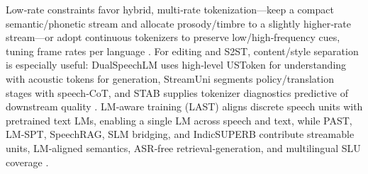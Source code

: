 \documentclass{article}
\begin{document}
Low‑rate constraints favor hybrid, multi‑rate tokenization—keep a compact semantic/phonetic stream and allocate prosody/timbre to a slightly higher‑rate stream—or adopt continuous tokenizers to preserve low/high‑frequency cues, tuning frame rates per language \cite{li2025continuousspeechtokenizertext,zhang2025impactframeratesspeechtokenizercasestudy,yang2025almtokenizerlowbitratesemanticrichaudioc,yang2025diffsoundstreamefficientspeechtokenizati}. For editing and S2ST, content/style separation is especially useful: DualSpeechLM uses high‑level USToken for understanding with acoustic tokens for generation, StreamUni segments policy/translation stages with speech‑CoT, and STAB supplies tokenizer diagnostics predictive of downstream quality \cite{wang2025dualspeechlmtowardsunifiedspeechundersta,guo2025streamuniachievingstreamingspeechtransla,vashishth2024stabspeechtokenizerassessmentbenchmark}. LM‑aware training (LAST) aligns discrete speech units with pretrained text LMs, enabling a single LM across speech and text, while PAST, LM‑SPT, SpeechRAG, SLM bridging, and IndicSUPERB contribute streamable units, LM‑aligned semantics, ASR‑free retrieval‑generation, and multilingual SLU coverage \cite{turetzky2024lastlanguagemodelawarespeechtokenization,har-tuv2025pastphoneticacousticspeechtokenizer,jo2025lmsptalignedsemanticdistillationspeechto,min2025speechretrievalaugmentedgenerationwithou,wang2023slmbridgethingapbetweenspeechtextfoundat,entry2025indicsuperbspeechprocessinguniversalperf}. 
\end{document}
